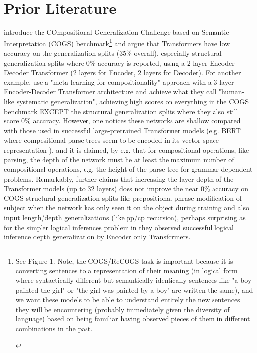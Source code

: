\documentclass[11pt]{article}
\begin{document}
\section{Prior Literature}
\cite{KimLinzen2020} introduce the COmpositional Generalization Challenge based on Semantic Interpretation (COGS) benchmark\footnote{
\begin{tiny}
See Figure 1. Note, the COGS/ReCOGS task is important because it is converting sentences to a representation of their meaning (in logical form where syntactically different but semantically identically sentences like "a boy painted the girl" or "the girl was painted by a boy" are written the same), and we want these models to be able to understand entirely the new sentences they will be encountering (probably immediately given the diversity of language) based on being familiar having observed pieces of them in different combinations in the past.
\end{tiny}
} and argue that Transformers have low accuracy on the generalization splits (35\% overall), especially structural generalization splits where 0\% accuracy is reported, using a 2-layer Encoder-Decoder Transformer (2 layers for Encoder, 2 layers for Decoder).
For another example, \cite{lake2023human} use a "meta-learning for compositionality" approach with a 3-layer Encoder-Decoder Transformer architecture and achieve what they call "human-like systematic generalization", achieving high scores on everything in the COGS benchmark EXCEPT the structural generalization splits where they also still score 0\% accuracy.
However, one notices these networks are shallow compared with those used in successful large-pretrained Transformer models (e.g. BERT where compositional parse trees seem to be encoded in its vector space representation \cite{hewitt-manning-2019-structural}), and it is claimed, by e.g. \cite{Csordas2022} that for compositional operations, like parsing, the depth of the network must be at least the maximum number of compositional operations, e.g. the height of the parse tree for grammar dependent problems. Remarkably, \cite{petty2024impactdepthcompositionalgeneralization} further claims that increasing the layer depth of the Transformer models (up to 32 layers) does not improve the near 0\% accuracy on COGS structural generalization splits like prepositional phrase modification of subject when the network has only seen it on the object during training and also input length/depth generalizations (like pp/cp recursion), perhaps surprising as for the simpler logical inferences problem in \cite{Clark2020} they observed successful logical inference depth generalization by Encoder only Transformers.
\end{document}
